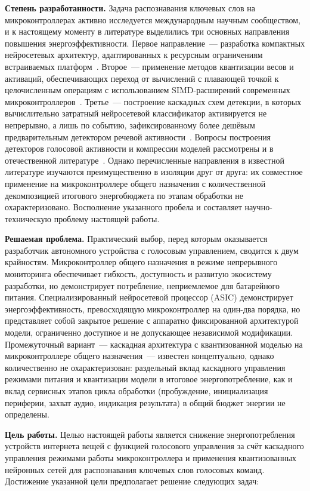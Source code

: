 \textbf{Степень разработанности.} Задача распознавания ключевых слов на
микроконтроллерах активно исследуется международным научным
сообществом, и к настоящему моменту в литературе выделились три основных
направления повышения энергоэффективности. Первое направление~---
разработка компактных нейросетевых архитектур, адаптированных к
ресурсным ограничениям встраиваемых платформ~\cite{src:1, src:12}.
Второе~--- применение методов квантизации весов и активаций,
обеспечивающих переход от вычислений с плавающей точкой к целочисленным
операциям с использованием SIMD-расширений современных
микроконтроллеров~\cite{src:3, src:22}. Третье~--- построение каскадных
схем детекции, в которых вычислительно затратный нейросетевой
классификатор активируется не непрерывно, а лишь по событию,
зафиксированному более дешёвым предварительным детектором речевой
активности~\cite{src:6, src:7}. Вопросы построения детекторов голосовой
активности и компрессии моделей рассмотрены и в отечественной
литературе~\cite{src:23, src:24, src:26, src:27}. Однако перечисленные
направления в известной литературе изучаются преимущественно в изоляции
друг от друга: их совместное применение на микроконтроллере общего
назначения с количественной декомпозицией итогового энергобюджета по
этапам обработки не охарактеризовано. Восполнение указанного пробела и
составляет научно-техническую проблему настоящей работы.

\textbf{Решаемая проблема.} Практический выбор, перед которым
оказывается разработчик автономного устройства с голосовым управлением,
сводится к двум крайностям. Микроконтроллер общего назначения в режиме
непрерывного мониторинга обеспечивает гибкость, доступность и развитую
экосистему разработки, но демонстрирует потребление, неприемлемое для
батарейного питания. Специализированный нейросетевой процессор (ASIC)
демонстрирует энергоэффективность, превосходящую микроконтроллер на
один-два порядка, но представляет собой закрытое решение с аппаратно
фиксированной архитектурой модели, ограниченно доступное и не
допускающее независимой модификации. Промежуточный вариант~--- каскадная
архитектура с квантизованной моделью на микроконтроллере общего
назначения~--- известен концептуально, однако количественно не
охарактеризован: раздельный вклад каскадного управления режимами питания
и квантизации модели в итоговое энергопотребление, как и вклад сервисных
этапов цикла обработки (пробуждение, инициализация периферии, захват
аудио, индикация результата) в общий бюджет энергии не определены.

\textbf{Цель работы.} Целью настоящей работы является снижение
энергопотребления устройств интернета вещей с функцией голосового
управления за счёт каскадного управления режимами работы
микроконтроллера и применения квантизованных нейронных сетей для
распознавания ключевых слов голосовых команд. Достижение указанной цели
предполагает решение следующих задач:

